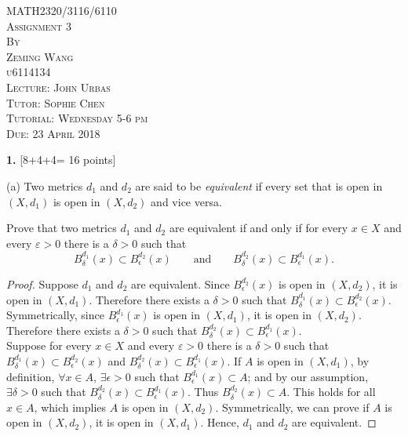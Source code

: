 \documentclass[11pt,a4paper]{amsart}
\def\d{\delta}
\def\e{\epsilon}
\begin{document}
\thispagestyle{empty}
\begin{center}
\huge
\vspace*{1.0in} MATH2320/3116/6110
\\\vspace{0.5in} \textsc{Assignment 3}
\normalsize
\\\vspace{0.5in} \textsc{By}
\\\vspace{0.1in} \textsc{Zeming Wang}
\\\vspace{0.1in} \textsc{u6114134}
\normalsize
\\\vspace{0.5in} \textsc{Lecture: John Urbas}
\\\vspace{0.1in} \textsc{Tutor: Sophie Chen}
\\\vspace{0.1in} \textsc{Tutorial: Wednesday 5-6 pm}
\normalsize
\\\vspace{0.5in} \textsc{Due: 23 April 2018}
\end{center}

\newpage
\setcounter{page}{1}






{\bf 1.} [8+4+4= 16 points]

(a) Two metrics $d_1$ and $d_2$ are said to be {\it equivalent} if every set that is open
in $(X,d_1)$ is open in $(X,d_2)$ and vice versa.

Prove that two metrics $d_1$ and $d_2$ are equivalent if and only if for every $x\in X$
and every $\varepsilon>0$ there is a $\delta>0$ such that
$$ B_\d^{d_1}(x) \subset B_\e^{d_2}(x)
\qquad\mbox{and}\qquad
B_\d^{d_2}(x) \subset B_\e^{d_1}(x). $$


\begin{proof}
Suppose $d_1$ and $d_2$ are equivalent.
Since $B_\e^{d_2}(x)$ is open in $(X, d_2)$, it is open in $(X, d_1)$.
Therefore there exists a $\d>0$ such that $ B_\d^{d_1}(x) \subset B_\e^{d_2}(x)$.
Symmetrically, since $B_\e^{d_1}(x)$ is open in $(X, d_1)$, it is open in $(X, d_2)$.
Therefore there exists a $\d>0$ such that $ B_\d^{d_2}(x) \subset B_\e^{d_1}(x)$. \\

Suppose  for every $x\in X$ and every $\varepsilon>0$ there is a $\delta>0$ such that
$ B_\d^{d_1}(x) \subset B_\e^{d_2}(x) $ and $B_\d^{d_2}(x) \subset B_\e^{d_1}(x)$.
If $A$ is open in $(X, d_1)$, by definition, $\forall x \in A$, $\exists \e>0$ such that
$B_{\e}^{d_1}(x) \subset A$; and by our assumption, $\exists\d>0$ such that
$B_\d^{d_2}(x) \subset B_\e^{d_1}(x)$. Thus $B_\d^{d_2}(x) \subset A$.
This holds for all $x\in A$, which implies $A$ is open in $(X, d_2)$.
Symmetrically, we can prove if $A$ is open in $(X,d_2)$, it is open in $(X,d_1)$.
Hence, $d_1$ and $d_2$ are equivalent.
\end{proof}
\end{document}
